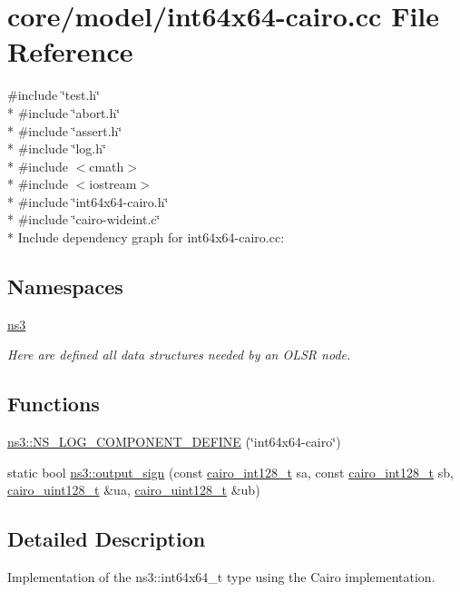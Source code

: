 \hypertarget{int64x64-cairo_8cc}{}\section{core/model/int64x64-\/cairo.cc File Reference}
\label{int64x64-cairo_8cc}
{\ttfamily \#include \char`\"{}test.\+h\char`\"{}}\\*
{\ttfamily \#include \char`\"{}abort.\+h\char`\"{}}\\*
{\ttfamily \#include \char`\"{}assert.\+h\char`\"{}}\\*
{\ttfamily \#include \char`\"{}log.\+h\char`\"{}}\\*
{\ttfamily \#include $<$cmath$>$}\\*
{\ttfamily \#include $<$iostream$>$}\\*
{\ttfamily \#include \char`\"{}int64x64-\/cairo.\+h\char`\"{}}\\*
{\ttfamily \#include \char`\"{}cairo-\/wideint.\+c\char`\"{}}\\*
Include dependency graph for int64x64-\/cairo.cc\+:
\subsection*{Namespaces}
\begin{DoxyCompactItemize}
\item 
 \hyperlink{namespacens3}{ns3}
\begin{DoxyCompactList}\small\item\em Here are defined all data structures needed by an O\+L\+SR node. \end{DoxyCompactList}\end{DoxyCompactItemize}
\subsection*{Functions}
\begin{DoxyCompactItemize}
\item 
\hyperlink{namespacens3_af22fb93ed6c0dafeb2daf3a7bd87a889}{ns3\+::\+N\+S\+\_\+\+L\+O\+G\+\_\+\+C\+O\+M\+P\+O\+N\+E\+N\+T\+\_\+\+D\+E\+F\+I\+NE} (\char`\"{}int64x64-\/cairo\char`\"{})
\item 
static bool \hyperlink{group__highprec_gabc1eadf47a990215c1b0b131d4f52cf9}{ns3\+::output\+\_\+sign} (const \hyperlink{cairo-wideint-private_8h_adb77a91a0053b771957b37c1a822a228}{cairo\+\_\+int128\+\_\+t} sa, const \hyperlink{cairo-wideint-private_8h_adb77a91a0053b771957b37c1a822a228}{cairo\+\_\+int128\+\_\+t} sb, \hyperlink{cairo-wideint-private_8h_ab99b9c539c5f08b381ec3797b3fcd872}{cairo\+\_\+uint128\+\_\+t} \&ua, \hyperlink{cairo-wideint-private_8h_ab99b9c539c5f08b381ec3797b3fcd872}{cairo\+\_\+uint128\+\_\+t} \&ub)
\end{DoxyCompactItemize}


\subsection{Detailed Description}
Implementation of the ns3\+::int64x64\+\_\+t type using the Cairo implementation. 